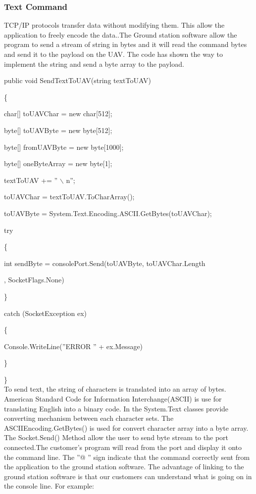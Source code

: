 \documentclass[oneside]{ecsgdp}         %
\begin{document}
\subsubsection*{Text Command}
TCP/IP protocols transfer data without modifying them. This allow the application to freely encode the data.\cite{davidB}.The Ground station software allow the program to send a stream of string in bytes and it will read the command bytes and send it to the payload on the UAV. The code has shown the way to implement the string and send a byte array to the payload.
	
	


	        public void SendTextToUAV(string textToUAV)
	        
        \{
        
       \tab \tab      char[] toUAVChar = new char[512];
       
        \tab \tab     byte[] toUAVByte = new byte[512];
        
       \tab \tab      byte[] fromUAVByte = new byte[1000];
       
       \tab \tab      byte[] oneByteArray = new byte[1];
       
       \tab  \tab      textToUAV += '' $\backslash$ n''; 
       
        \tab \tab     toUAVChar = textToUAV.ToCharArray();
        
       \tab \tab      toUAVByte = System.Text.Encoding.ASCII.GetBytes(toUAVChar);
       
       \tab \tab      try
       
      \tab   \tab     \{
      
     \tab \tab            int sendByte = consolePort.Send(toUAVByte, toUAVChar.Length
     
     \tab \tab, SocketFlags.None)\;
     
     \tab  \tab      \}
     
      \tab    \tab    catch (SocketException ex)
      
       \tab  \tab     \{
       
       \tab \tab  \tab         Console.WriteLine(''ERROR\: '' + ex.Message)\;
       
       \tab   \tab    \}
       
        \}
                \\
                

To send text, the string of characters is translated into an array of bytes. American Standard Code for Information Interchange(ASCII) is use for translating English into a binary code. In the System.Text classes provide converting mechanism between each character sets. The ASCIIEncoding.GetBytes() is used for convert character array into a byte array.  
The Socket.Send() Method allow the user to send byte stream to the port connected.The customer's program will read from the port and display it onto the command line. The ''@ '' sign indicate that the command correctly sent from the application to the ground station software. The advantage of linking to the ground station software is that our customers can understand what is going on in the console line. For example:
\end{document}
